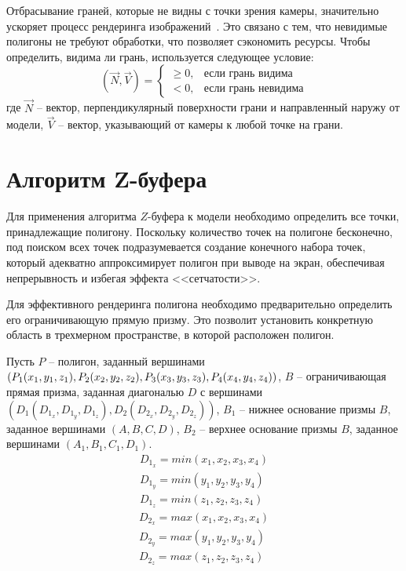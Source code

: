 Отбрасывание граней, которые не видны с точки зрения камеры, значительно ускоряет процесс рендеринга изображений~\cite{lit3}. Это связано с тем, что невидимые полигоны не требуют обработки, что позволяет сэкономить ресурсы. Чтобы определить, видима ли грань, используется следующее условие:
\begin{equation}
	(\vec{N}, \vec{V}) =
	\begin{cases}
		\geq 0, & \text{если грань видима} \\
		< 0, & \text{если грань невидима}
	\end{cases}
\end{equation}
где $\vec{N}$ -- вектор, перпендикулярный поверхности грани и направленный наружу от модели, $\vec{V}$ -- вектор, указывающий от камеры к любой точке на грани.

\section{Алгоритм Z-буфера}

Для применения алгоритма $Z$-буфера к модели необходимо определить все точки, принадлежащие полигону. Поскольку количество точек на полигоне бесконечно, под поиском всех точек подразумевается создание конечного набора точек, который адекватно аппроксимирует полигон при выводе на экран, обеспечивая непрерывность и избегая эффекта <<сетчатости>>.

Для эффективного рендеринга полигона необходимо предварительно определить его ограничивающую прямую призму. Это позволит установить конкретную область в трехмерном пространстве, в которой расположен полигон.

Пусть $P$ -- полигон, заданный вершинами $(P_1(x_1, y_1, z_1), P_2(x_2, y_2, z_2), \\ P_3(x_3, y_3, z_3), P_4(x_4, y_4, z_4))$, $B$ -- ограничивающая прямая призма, заданная диагональю $D$ с вершинами $(D_1(D_{1_x}, D_{1_y}, D_{1_z}), D_2(D_{2_x}, D_{2_y}, D_{2_z}))$, $B_1$ -- нижнее основание  призмы $B$, заданное вершинами $(A, B, C, D)$, $B_2$ -- верхнее основание призмы $B$, заданное вершинами $(A_1, B_1, C_1, D_1)$. 
\begin{equation}
	\begin{aligned}
		D_{1_x} = min(x_1, x_2, x_3, x_4) \\
		D_{1_y} = min(y_1, y_2, y_3, y_4) \\
		D_{1_z} = min(z_1, z_2, z_3, z_4) 
	\end{aligned}
\end{equation} 
\begin{equation}
	\begin{aligned}
		D_{2_x} = max(x_1, x_2, x_3, x_4) \\
		D_{2_y} = max(y_1, y_2, y_3, y_4) \\
		D_{2_z} = max(z_1, z_2, z_3, z_4) 
	\end{aligned}
\end{equation}

